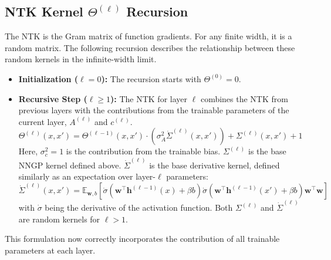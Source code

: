 \documentclass[12pt]{article}
\begin{document}
\subsection{NTK Kernel \(\Theta^{(\ell)}\) Recursion}
The NTK is the Gram matrix of function gradients. For any finite width, it is a random matrix. The following recursion describes the relationship between these random kernels in the infinite-width limit.
\begin{itemize}
    \item \textbf{Initialization (\(\ell=0\)):} The recursion starts with $\Theta^{(0)} = 0$.
    
    \item \textbf{Recursive Step (\(\ell \ge 1\)):} The NTK for layer $\ell$ combines the NTK from previous layers with the contributions from the trainable parameters of the current layer, $A^{(\ell)}$ and $c^{(\ell)}$.
    \begin{equation}
        \boxed{
        \Theta^{(\ell)}(x, x') = \Theta^{(\ell-1)}(x, x') \cdot \left(\sigma_A^2\dot{\Sigma}^{(\ell)}(x, x')\right) + \Sigma^{(\ell)}(x, x') + 1
        }
    \end{equation}
    Here, $\sigma_c^2=1$ is the contribution from the trainable bias. $\Sigma^{(\ell)}$ is the base NNGP kernel defined above. $\dot{\Sigma}^{(\ell)}$ is the base derivative kernel, defined similarly as an expectation over layer-$\ell$ parameters:
    \begin{equation}
        \dot{\Sigma}^{(\ell)}(x, x') = \mathbb{E}_{\bm{w}, b} \left[ \dot{\sigma}\left(\bm{w}^\top \bm{h}^{(\ell-1)}(x) + \beta b\right) \dot{\sigma}\left(\bm{w}^\top \bm{h}^{(\ell-1)}(x') + \beta b\right) \bm{w}^\top\bm{w} \right]
    \end{equation}
    with $\dot{\sigma}$ being the derivative of the activation function. Both $\Sigma^{(\ell)}$ and $\dot{\Sigma}^{(\ell)}$ are random kernels for $\ell > 1$.
\end{itemize}
This formulation now correctly incorporates the contribution of all trainable parameters at each layer.
\end{document}
